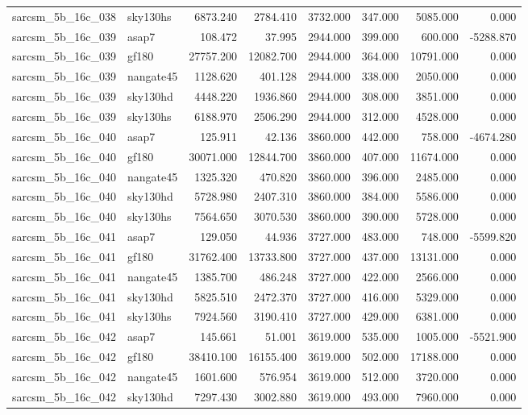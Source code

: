 \begin{tabular}{llrrrrrr}
sarcsm\_5b\_16c\_038 & sky130hs & 6873.240 & 2784.410 & 3732.000 & 347.000 & 5085.000 & 0.000 \\
sarcsm\_5b\_16c\_039 & asap7 & 108.472 & 37.995 & 2944.000 & 399.000 & 600.000 & -5288.870 \\
sarcsm\_5b\_16c\_039 & gf180 & 27757.200 & 12082.700 & 2944.000 & 364.000 & 10791.000 & 0.000 \\
sarcsm\_5b\_16c\_039 & nangate45 & 1128.620 & 401.128 & 2944.000 & 338.000 & 2050.000 & 0.000 \\
sarcsm\_5b\_16c\_039 & sky130hd & 4448.220 & 1936.860 & 2944.000 & 308.000 & 3851.000 & 0.000 \\
sarcsm\_5b\_16c\_039 & sky130hs & 6188.970 & 2506.290 & 2944.000 & 312.000 & 4528.000 & 0.000 \\
sarcsm\_5b\_16c\_040 & asap7 & 125.911 & 42.136 & 3860.000 & 442.000 & 758.000 & -4674.280 \\
sarcsm\_5b\_16c\_040 & gf180 & 30071.000 & 12844.700 & 3860.000 & 407.000 & 11674.000 & 0.000 \\
sarcsm\_5b\_16c\_040 & nangate45 & 1325.320 & 470.820 & 3860.000 & 396.000 & 2485.000 & 0.000 \\
sarcsm\_5b\_16c\_040 & sky130hd & 5728.980 & 2407.310 & 3860.000 & 384.000 & 5586.000 & 0.000 \\
sarcsm\_5b\_16c\_040 & sky130hs & 7564.650 & 3070.530 & 3860.000 & 390.000 & 5728.000 & 0.000 \\
sarcsm\_5b\_16c\_041 & asap7 & 129.050 & 44.936 & 3727.000 & 483.000 & 748.000 & -5599.820 \\
sarcsm\_5b\_16c\_041 & gf180 & 31762.400 & 13733.800 & 3727.000 & 437.000 & 13131.000 & 0.000 \\
sarcsm\_5b\_16c\_041 & nangate45 & 1385.700 & 486.248 & 3727.000 & 422.000 & 2566.000 & 0.000 \\
sarcsm\_5b\_16c\_041 & sky130hd & 5825.510 & 2472.370 & 3727.000 & 416.000 & 5329.000 & 0.000 \\
sarcsm\_5b\_16c\_041 & sky130hs & 7924.560 & 3190.410 & 3727.000 & 429.000 & 6381.000 & 0.000 \\
sarcsm\_5b\_16c\_042 & asap7 & 145.661 & 51.001 & 3619.000 & 535.000 & 1005.000 & -5521.900 \\
sarcsm\_5b\_16c\_042 & gf180 & 38410.100 & 16155.400 & 3619.000 & 502.000 & 17188.000 & 0.000 \\
sarcsm\_5b\_16c\_042 & nangate45 & 1601.600 & 576.954 & 3619.000 & 512.000 & 3720.000 & 0.000 \\
sarcsm\_5b\_16c\_042 & sky130hd & 7297.430 & 3002.880 & 3619.000 & 493.000 & 7960.000 & 0.000 \\

\end{tabular}
